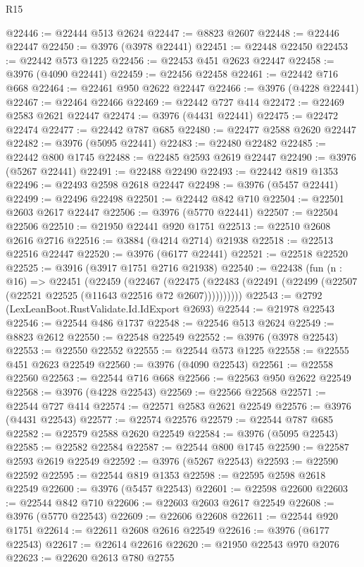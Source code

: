 \begin{lexlean}{R15}
\begin{coremodule}
@22446 := @22444 @513 @2624
@22447 := @8823 @2607
@22448 := @22446 @22447
@22450 := @3976 (@3978 @22441)
@22451 := @22448 @22450
@22453 := @22442 @573 @1225
@22456 := @22453 @451 @2623 @22447
@22458 := @3976 (@4090 @22441)
@22459 := @22456 @22458
@22461 := @22442 @716 @668
@22464 := @22461 @950 @2622 @22447
@22466 := @3976 (@4228 @22441)
@22467 := @22464 @22466
@22469 := @22442 @727 @414
@22472 := @22469 @2583 @2621 @22447
@22474 := @3976 (@4431 @22441)
@22475 := @22472 @22474
@22477 := @22442 @787 @685
@22480 := @22477 @2588 @2620 @22447
@22482 := @3976 (@5095 @22441)
@22483 := @22480 @22482
@22485 := @22442 @800 @1745
@22488 := @22485 @2593 @2619 @22447
@22490 := @3976 (@5267 @22441)
@22491 := @22488 @22490
@22493 := @22442 @819 @1353
@22496 := @22493 @2598 @2618 @22447
@22498 := @3976 (@5457 @22441)
@22499 := @22496 @22498
@22501 := @22442 @842 @710
@22504 := @22501 @2603 @2617 @22447
@22506 := @3976 (@5770 @22441)
@22507 := @22504 @22506
@22510 := @21950 @22441 @920 @1751
@22513 := @22510 @2608 @2616 @2716
@22516 := @3884 (@4214 @2714) @21938
@22518 := @22513 @22516 @22447
@22520 := @3976 (@6177 @22441)
@22521 := @22518 @22520
@22525 := @3916 (@3917 @1751 @2716 @21938)
@22540 := @22438
    (fun (n : @16) =>
    @22451
      (@22459
        (@22467
          (@22475 (@22483 (@22491 (@22499 (@22507 (@22521 @22525 (@11643 @22516 @72 @2607))))))))))
@22543 := @2792 (LexLeanBoot.RustValidate.Id.IdExport @2693)
@22544 := @21978 @22543
@22546 := @22544 @486 @1737
@22548 := @22546 @513 @2624
@22549 := @8823 @2612
@22550 := @22548 @22549
@22552 := @3976 (@3978 @22543)
@22553 := @22550 @22552
@22555 := @22544 @573 @1225
@22558 := @22555 @451 @2623 @22549
@22560 := @3976 (@4090 @22543)
@22561 := @22558 @22560
@22563 := @22544 @716 @668
@22566 := @22563 @950 @2622 @22549
@22568 := @3976 (@4228 @22543)
@22569 := @22566 @22568
@22571 := @22544 @727 @414
@22574 := @22571 @2583 @2621 @22549
@22576 := @3976 (@4431 @22543)
@22577 := @22574 @22576
@22579 := @22544 @787 @685
@22582 := @22579 @2588 @2620 @22549
@22584 := @3976 (@5095 @22543)
@22585 := @22582 @22584
@22587 := @22544 @800 @1745
@22590 := @22587 @2593 @2619 @22549
@22592 := @3976 (@5267 @22543)
@22593 := @22590 @22592
@22595 := @22544 @819 @1353
@22598 := @22595 @2598 @2618 @22549
@22600 := @3976 (@5457 @22543)
@22601 := @22598 @22600
@22603 := @22544 @842 @710
@22606 := @22603 @2603 @2617 @22549
@22608 := @3976 (@5770 @22543)
@22609 := @22606 @22608
@22611 := @22544 @920 @1751
@22614 := @22611 @2608 @2616 @22549
@22616 := @3976 (@6177 @22543)
@22617 := @22614 @22616
@22620 := @21950 @22543 @970 @2076
@22623 := @22620 @2613 @780 @2755

\end{coremodule}
\end{lexlean}
